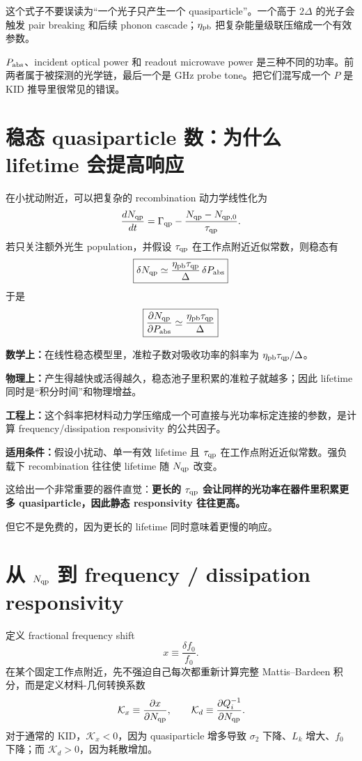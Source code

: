 \documentclass[11pt,a4paper,openany]{ctexrep}
\newcommand{\formulaexplain}[4]{%
\begin{formulaguidebox}
\textbf{\color{KidBlue}数学上：}#1\par
\textbf{\color{KidTeal}物理上：}#2\par
\textbf{\color{KidGold!55!black}工程上：}#3\par
\textbf{\color{KidRed}适用条件：}#4
\end{formulaguidebox}%
}
\begin{document}
这个式子不要误读为“一个光子只产生一个 quasiparticle”。一个高于 $2\Delta$ 的光子会触发 pair breaking 和后续 phonon cascade；$\eta_{\rm pb}$ 把复杂能量级联压缩成一个有效参数。

\begin{mistakebox}
$P_{\rm abs}$、incident optical power 和 readout microwave power 是三种不同的功率。前两者属于被探测的光学链，最后一个是 GHz probe tone。把它们混写成一个 $P$ 是 KID 推导里很常见的错误。
\end{mistakebox}

\section{稳态 quasiparticle 数：为什么 lifetime 会提高响应}

在小扰动附近，可以把复杂的 recombination 动力学线性化为
\[
\frac{dN_{\rm qp}}{dt}=\Gamma_{\rm qp}-\frac{N_{\rm qp}-N_{\rm qp,0}}{\tau_{\rm qp}}.
\]
若只关注额外光生 population，并假设 $\tau_{\rm qp}$ 在工作点附近近似常数，则稳态有
\[
\boxed{
\delta N_{\rm qp}
\simeq
\frac{\eta_{\rm pb}\tau_{\rm qp}}{\Delta}
\,\delta P_{\rm abs}
}
\]
于是
\[
\boxed{
\frac{\partial N_{\rm qp}}{\partial P_{\rm abs}}
\simeq
\frac{\eta_{\rm pb}\tau_{\rm qp}}{\Delta}
}
\]
\formulaexplain
{在线性稳态模型里，准粒子数对吸收功率的斜率为 $\eta_{\rm pb}\tau_{\rm qp}/\Delta$。}
{产生得越快或活得越久，稳态池子里积累的准粒子就越多；因此 lifetime 同时是“积分时间”和物理增益。}
{这个斜率把材料动力学压缩成一个可直接与光功率标定连接的参数，是计算 frequency/dissipation responsivity 的公共因子。}
{假设小扰动、单一有效 lifetime 且 $\tau_{\rm qp}$ 在工作点附近近似常数。强负载下 recombination 往往使 lifetime 随 $N_{\rm qp}$ 改变。}

这给出一个非常重要的器件直觉：\textbf{更长的 $\tau_{\rm qp}$ 会让同样的光功率在器件里积累更多 quasiparticle，因此静态 responsivity 往往更高。}

但它不是免费的，因为更长的 lifetime 同时意味着更慢的响应。

\section{从 $N_{\rm qp}$ 到 frequency / dissipation responsivity}

定义 fractional frequency shift
\[
x\equiv \frac{\delta f_0}{f_0}.
\]
在某个固定工作点附近，先不强迫自己每次都重新计算完整 Mattis--Bardeen 积分，而是定义材料-几何转换系数
\[
\mathcal K_x\equiv \frac{\partial x}{\partial N_{\rm qp}},
\qquad
\mathcal K_d\equiv
\frac{\partial Q_i^{-1}}{\partial N_{\rm qp}}.
\]
对于通常的 KID，$\mathcal K_x<0$，因为 quasiparticle 增多导致 $\sigma_2$ 下降、$L_k$ 增大、$f_0$ 下降；而 $\mathcal K_d>0$，因为耗散增加。
\end{document}
